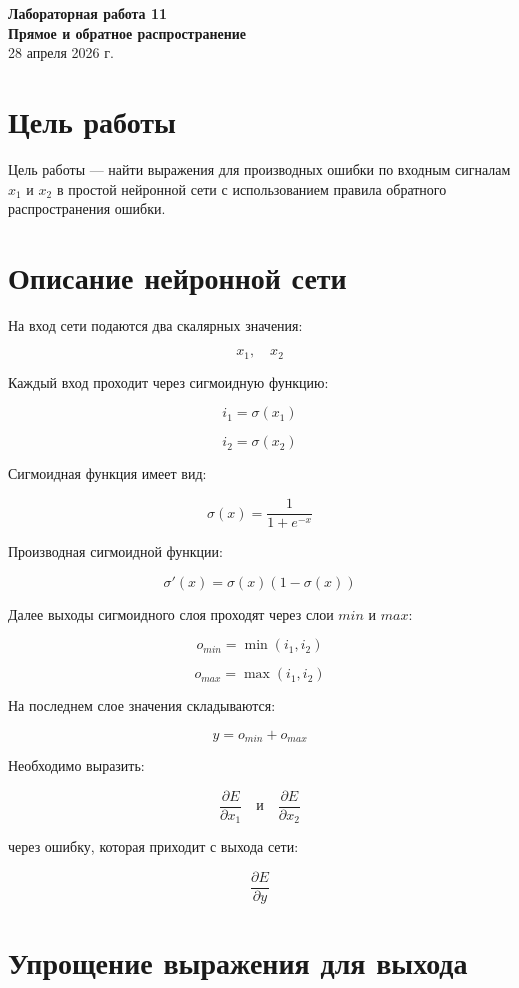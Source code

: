 \documentclass[a4paper,12pt]{article}
\begin{document}
\begin{center}
    \Large\textbf{Лабораторная работа 11}\\
    \large\textbf{Прямое и обратное распространение}\\
    \vspace{0.5cm}
    28 апреля 2026 г.
\end{center}

\section*{Цель работы}

Цель работы --- найти выражения для производных ошибки по входным сигналам $x_1$ и $x_2$ в простой нейронной сети с использованием правила обратного распространения ошибки.

\section*{Описание нейронной сети}

На вход сети подаются два скалярных значения:

\[
x_1, \quad x_2
\]

Каждый вход проходит через сигмоидную функцию:

\[
i_1 = \sigma(x_1)
\]

\[
i_2 = \sigma(x_2)
\]

Сигмоидная функция имеет вид:

\[
\sigma(x) = \frac{1}{1 + e^{-x}}
\]

Производная сигмоидной функции:

\[
\sigma'(x) = \sigma(x)(1 - \sigma(x))
\]

Далее выходы сигмоидного слоя проходят через слои $min$ и $max$:

\[
o_{min} = \min(i_1, i_2)
\]

\[
o_{max} = \max(i_1, i_2)
\]

На последнем слое значения складываются:

\[
y = o_{min} + o_{max}
\]

Необходимо выразить:

\[
\frac{\partial E}{\partial x_1}
\quad \text{и} \quad
\frac{\partial E}{\partial x_2}
\]

через ошибку, которая приходит с выхода сети:

\[
\frac{\partial E}{\partial y}
\]

\section*{Упрощение выражения для выхода}
\end{document}
